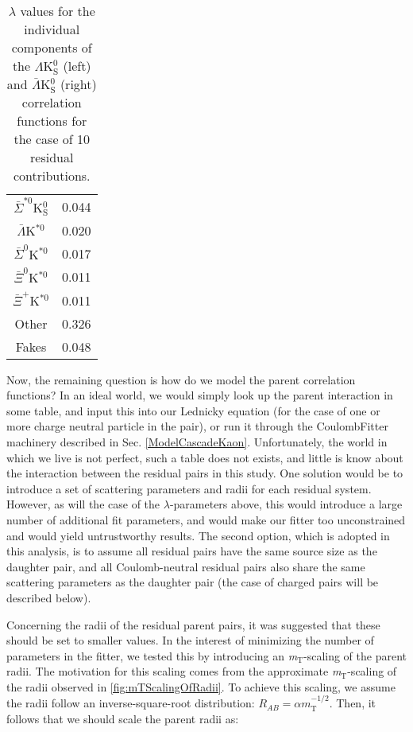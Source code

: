 \documentclass[ALICE,manyauthors]{cernphprep}
\begin{document}
\begin{table}[htbp]
\begin{minipage}{0.3\textwidth}
\begin{tabular}{|c|c|}
   $\bar{\Sigma}^{*0}$K$^{0}_{\mathrm{S}}$ & 0.044 \\
   $\bar{\Lambda}$K$^{*0}$ & 0.020 \\
   $\bar{\Sigma}^{0}$K$^{*0}$ & 0.017 \\
   $\bar{\Xi}^{0}$K$^{*0}$ & 0.011 \\
   $\bar{\Xi}^{+}$K$^{*0}$ & 0.011 \\
   Other & 0.326 \\
   Fakes & 0.048 \\
   \hline
  \end{tabular}
 \end{minipage} 
 \caption{$\lambda$ values for the individual components of the $\Lambda$K$^{0}_{\mathrm{S}}$ (left) and $\bar{\Lambda}$K$^{0}_{\mathrm{S}}$ (right) correlation functions for the case of 10 residual contributions.}
 \label{tab:LambdaValues_10Res_LamK0}
\end{table}



Now, the remaining question is how do we model the parent correlation functions?  In an ideal world, we would simply look up the parent interaction in some table, and input this into our Lednicky equation (for the case of one or more charge neutral particle in the pair), or run it through the CoulombFitter machinery described in Sec. \ref{ModelCascadeKaon}.  Unfortunately, the world in which we live is not perfect, such a table does not exists, and little is know about the interaction between the residual pairs in this study.  One solution would be to introduce a set of scattering parameters and radii for each residual system.  However, as will the case of the $\lambda$-parameters above, this would introduce a large number of additional fit parameters, and would make our fitter too unconstrained and would yield untrustworthy results.  The second option, which is adopted in this analysis, is to assume all residual pairs have the same source size as the daughter pair, and all Coulomb-neutral residual pairs also share the same scattering parameters as the daughter pair (the case of charged pairs will be described below).

Concerning the radii of the residual parent pairs, it was suggested that these should be set to smaller values.  In the interest of minimizing the number of parameters in the fitter, we tested this by introducing an \textit{m}$_{\mathrm{T}}$-scaling of the parent radii.  The motivation for this scaling comes from the approximate \textit{m}$_{\mathrm{T}}$-scaling of the radii observed in \ref{fig:mTScalingOfRadii}.  To achieve this scaling, we assume the radii follow an inverse-square-root distribution: $R_{AB} = \alpha m_{\mathrm{T}}^{-1/2}$.  Then, it follows that we should scale the parent radii as:
\end{document}
